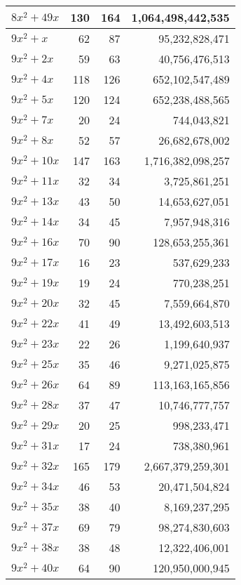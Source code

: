 \documentclass[a4paper]{amsproc}
\theoremstyle{plain}
\begin{document}
\begin{longtable}{ | l | r | r | r | }
$8x^2 + 49x$ & 130 & 164 & 1{,}064{,}498{,}442{,}535 \\ \hline
$9x^2 + x$ & 62 & 87 & 95{,}232{,}828{,}471 \\ \hline
$9x^2 + 2x$ & 59 & 63 & 40{,}756{,}476{,}513 \\ \hline
$9x^2 + 4x$ & 118 & 126 & 652{,}102{,}547{,}489 \\ \hline
$9x^2 + 5x$ & 120 & 124 & 652{,}238{,}488{,}565 \\ \hline
$9x^2 + 7x$ & 20 & 24 & 744{,}043{,}821 \\ \hline
$9x^2 + 8x$ & 52 & 57 & 26{,}682{,}678{,}002 \\ \hline
$9x^2 + 10x$ & 147 & 163 & 1{,}716{,}382{,}098{,}257 \\ \hline
$9x^2 + 11x$ & 32 & 34 & 3{,}725{,}861{,}251 \\ \hline
$9x^2 + 13x$ & 43 & 50 & 14{,}653{,}627{,}051 \\ \hline
$9x^2 + 14x$ & 34 & 45 & 7{,}957{,}948{,}316 \\ \hline
$9x^2 + 16x$ & 70 & 90 & 128{,}653{,}255{,}361 \\ \hline
$9x^2 + 17x$ & 16 & 23 & 537{,}629{,}233 \\ \hline
$9x^2 + 19x$ & 19 & 24 & 770{,}238{,}251 \\ \hline
$9x^2 + 20x$ & 32 & 45 & 7{,}559{,}664{,}870 \\ \hline
$9x^2 + 22x$ & 41 & 49 & 13{,}492{,}603{,}513 \\ \hline
$9x^2 + 23x$ & 22 & 26 & 1{,}199{,}640{,}937 \\ \hline
$9x^2 + 25x$ & 35 & 46 & 9{,}271{,}025{,}875 \\ \hline
$9x^2 + 26x$ & 64 & 89 & 113{,}163{,}165{,}856 \\ \hline
$9x^2 + 28x$ & 37 & 47 & 10{,}746{,}777{,}757 \\ \hline
$9x^2 + 29x$ & 20 & 25 & 998{,}233{,}471 \\ \hline
$9x^2 + 31x$ & 17 & 24 & 738{,}380{,}961 \\ \hline
$9x^2 + 32x$ & 165 & 179 & 2{,}667{,}379{,}259{,}301 \\ \hline
$9x^2 + 34x$ & 46 & 53 & 20{,}471{,}504{,}824 \\ \hline
$9x^2 + 35x$ & 38 & 40 & 8{,}169{,}237{,}295 \\ \hline
$9x^2 + 37x$ & 69 & 79 & 98{,}274{,}830{,}603 \\ \hline
$9x^2 + 38x$ & 38 & 48 & 12{,}322{,}406{,}001 \\ \hline
$9x^2 + 40x$ & 64 & 90 & 120{,}950{,}000{,}945 \\ \hline

\end{longtable}
\end{document}
